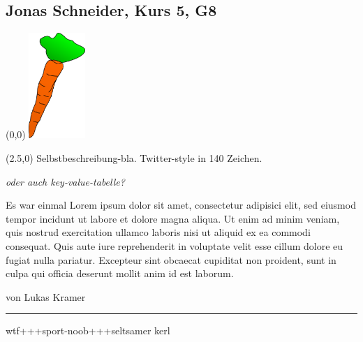 \subsection*{Jonas Schneider, Kurs 5, G8}
\begin{textblock}{2.5}(0,0)
	\noindent\mbox{\includegraphics[height=4cm ]{karotte2.png}} %
\end{textblock}

\begin{textblock}{10}(2.5,0)
	\setlength{\parindent}{0cm}
	Selbstbeschreibung-bla. Twitter-style in 140 Zeichen.
	
	{\em oder auch key-value-tabelle?}
\end{textblock}

\vspace{4.5cm}
Es war einmal Lorem ipsum dolor sit amet, consectetur adipisici elit, sed eiusmod tempor incidunt ut labore et dolore magna aliqua. Ut enim ad minim veniam, quis nostrud exercitation ullamco laboris nisi ut aliquid ex ea commodi consequat. Quis aute iure reprehenderit in voluptate velit esse cillum dolore eu fugiat nulla pariatur. Excepteur sint obcaecat cupiditat non proident, sunt in culpa qui officia deserunt mollit anim id est laborum.

\vspace{3mm}
von Lukas Kramer
\vfill
\hrule
\vspace{2mm}
{\small
wtf+++sport-noob+++seltsamer kerl
}

\newpage
